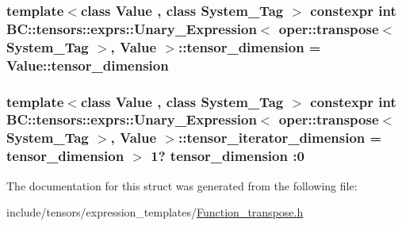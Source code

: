 \subsubsection[{\texorpdfstring{tensor\+\_\+dimension}{tensor_dimension}}]{\setlength{\rightskip}{0pt plus 5cm}template$<$class Value , class System\+\_\+\+Tag $>$ constexpr int {\bf B\+C\+::tensors\+::exprs\+::\+Unary\+\_\+\+Expression}$<$ {\bf oper\+::transpose}$<$ System\+\_\+\+Tag $>$, Value $>$\+::tensor\+\_\+dimension = Value\+::tensor\+\_\+dimension\hspace{0.3cm}{\ttfamily [static]}}\hypertarget{structBC_1_1tensors_1_1exprs_1_1Unary__Expression_3_01oper_1_1transpose_3_01System__Tag_01_4_00_01Value_01_4_acdfcb73f67e5e333b2a859827d16193c}{}\label{structBC_1_1tensors_1_1exprs_1_1Unary__Expression_3_01oper_1_1transpose_3_01System__Tag_01_4_00_01Value_01_4_acdfcb73f67e5e333b2a859827d16193c}
\subsubsection[{\texorpdfstring{tensor\+\_\+iterator\+\_\+dimension}{tensor_iterator_dimension}}]{\setlength{\rightskip}{0pt plus 5cm}template$<$class Value , class System\+\_\+\+Tag $>$ constexpr int {\bf B\+C\+::tensors\+::exprs\+::\+Unary\+\_\+\+Expression}$<$ {\bf oper\+::transpose}$<$ System\+\_\+\+Tag $>$, Value $>$\+::tensor\+\_\+iterator\+\_\+dimension = {\bf tensor\+\_\+dimension} $>$ 1? {\bf tensor\+\_\+dimension} \+:0\hspace{0.3cm}{\ttfamily [static]}}\hypertarget{structBC_1_1tensors_1_1exprs_1_1Unary__Expression_3_01oper_1_1transpose_3_01System__Tag_01_4_00_01Value_01_4_a1c87174aa66793563bd9b65a1865fcc7}{}\label{structBC_1_1tensors_1_1exprs_1_1Unary__Expression_3_01oper_1_1transpose_3_01System__Tag_01_4_00_01Value_01_4_a1c87174aa66793563bd9b65a1865fcc7}


The documentation for this struct was generated from the following file\+:\begin{DoxyCompactItemize}
\item 
include/tensors/expression\+\_\+templates/\hyperlink{Function__transpose_8h}{Function\+\_\+transpose.\+h}\end{DoxyCompactItemize}
